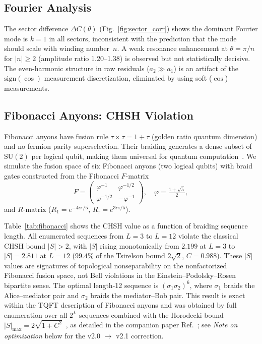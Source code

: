 \documentclass[aps,pra,twocolumn,superscriptaddress,showpacs,floatfix]{revtex4-2}
\begin{document}
\subsection{Fourier Analysis}

The sector difference $\Delta C(\theta)$ (Fig.~\ref{fig:sector_corr}) shows the dominant Fourier mode is
$k = 1$ in all sectors, inconsistent with the prediction that the mode should
scale with winding number~$n$. A weak resonance enhancement at $\theta = \pi/n$
for $|n| \geq 2$ (amplitude ratio 1.20--1.38) is observed but not statistically
decisive. The even-harmonic structure in raw residuals ($a_2 \gg a_1$) is an
artifact of the $\mathrm{sign}(\cos)$ measurement discretization, eliminated by
using soft ($\cos$) measurements.

\subsection{Fibonacci Anyons: CHSH Violation}
\label{sec:fibonacci}

Fibonacci anyons have fusion rule $\tau \times \tau = 1 + \tau$ (golden ratio
quantum dimension) and no fermion parity superselection. Their braiding generates
a dense subset of $\mathrm{SU}(2)$ per logical qubit, making them universal
for quantum computation~\cite{Freedman2003}. We simulate the fusion space of
six Fibonacci anyons (two logical qubits) with braid gates constructed from the
Fibonacci
$F$-matrix
\begin{equation}
  F = \begin{pmatrix} \varphi^{-1} & \varphi^{-1/2} \\
  \varphi^{-1/2} & -\varphi^{-1} \end{pmatrix},
  \quad \varphi = \tfrac{1+\sqrt{5}}{2},
  \label{eq:fib_f_matrix}
\end{equation}
and $R$-matrix ($R_1 = e^{-4i\pi/5}$, $R_\tau = e^{3i\pi/5}$).

Table~\ref{tab:fibonacci} shows the CHSH value as a function of braiding sequence
length. All enumerated sequences from $L=3$ to $L=12$ violate the classical
CHSH bound $|S|>2$, with $|S|$ rising monotonically from $2.199$ at $L=3$ to
$|S|=2.811$ at $L=12$ ($99.4\%$ of the Tsirelson bound $2\sqrt{2}$, $C=0.988$).
These $|S|$ values are signatures of topological nonseparability on the
nonfactorized Fibonacci fusion space, not Bell violations in the
Einstein--Podolsky--Rosen bipartite sense.
The optimal length-12 sequence is
$(\sigma_1\sigma_2)^6$,
where $\sigma_1$ braids the Alice--mediator pair and $\sigma_2$ braids the
mediator--Bob pair. This result is exact within the TQFT description of Fibonacci
anyons and was obtained by full enumeration over all $2^L$ sequences combined
with the Horodecki bound $|S|_{\max} = 2\sqrt{1+C^2}$~\cite{Horodecki1995}, as
detailed in the companion paper Ref.~\cite{Sayim2026fibonacci}; see
\textit{Note on optimization} below for the v2.0 $\to$ v2.1 correction.
\end{document}
